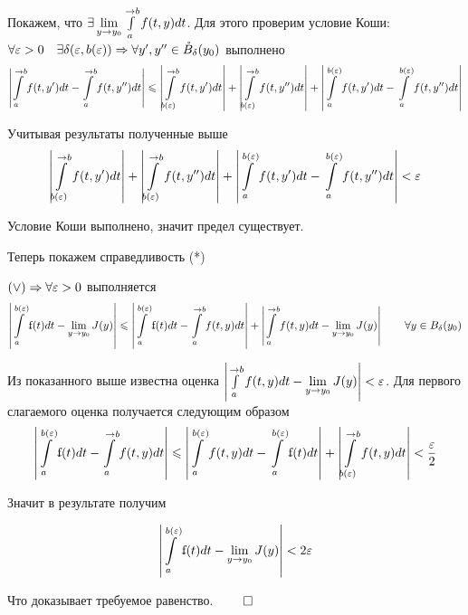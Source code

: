 Покажем, что $\exists \lim\limits_{y \rightarrow y_0}\int\limits_a^{\rightarrow b} f(t, y) dt$. Для этого проверим условие Коши: $\forall \varepsilon > 0 \quad \exists \delta(\varepsilon, b(\varepsilon)) \Rightarrow \forall y', y'' \in \mathring{B}_\delta(y_0)$ выполнено
$$\left| \int\limits_a^{\rightarrow b}f(t, y') dt - \int\limits_a^{\rightarrow b} f(t, y'')dt \right| \leqslant \left| \int\limits_{b(\varepsilon)}^{\rightarrow b} f(t, y')dt \right| + \left| \int\limits_{b(\varepsilon)}^{\rightarrow b} f(t, y'')dt \right| + \left| \int\limits_a^{b(\varepsilon)}f(t, y') dt - \int\limits_a^{b(\varepsilon)} f(t, y'')dt \right|$$

Учитывая результаты полученные выше
$$\left| \int\limits_{b(\varepsilon)}^{\rightarrow b} f(t, y')dt \right| + \left| \int\limits_{b(\varepsilon)}^{\rightarrow b} f(t, y'')dt \right| + \left| \int\limits_a^{b(\varepsilon)}f(t, y') dt - \int\limits_a^{b(\varepsilon)} f(t, y'')dt \right| < \varepsilon$$

Условие Коши выполнено, значит предел существует.

Теперь покажем справедливость (*)

$(\vee) \Rightarrow \forall \varepsilon > 0$ выполняется
$$\left| \int\limits^{b(\varepsilon)}_a \ff(t) dt - \lim\limits_{y \ra y_0} J(y) \right| \leq \left| \int\limits^{b(\varepsilon)}_a \ff(t) dt - \int\limits^{\ra b}_a f(t, y) dt \right| + \left| \int\limits^{\ra b}_a f(t, y) dt - \lim\limits_{y \ra y_0} J(y) \right| \qquad \forall y \in B_\delta(y_0)$$

Из показанного выше известна оценка $\left| \int\limits^{\rightarrow b}_a f(t, y) dt - \lim\limits_{y \rightarrow y_0} J(y) \right| < \varepsilon$. Для первого слагаемого оценка получается следующим образом
$$\left| \int\limits^{b(\varepsilon)}_a \ff(t) dt - \int\limits^{\ra b}_a f(t, y) dt \right| \leq \left| \int\limits_a^{b(\varepsilon)}f(t, y) dt - \int\limits_a^{b(\varepsilon)}\ff(t) dt\right| + \left| \int\limits_{b(\varepsilon)}^{\ra b} f(t, y) dt \right| < \frac{\varepsilon}{2}$$

Значит в результате получим

$$\left| \int\limits^{b(\varepsilon)}_a \ff(t) dt - \lim\limits_{y \ra y_0} J(y) \right| < 2 \varepsilon$$

Что доказывает требуемое равенство. $\qed$

